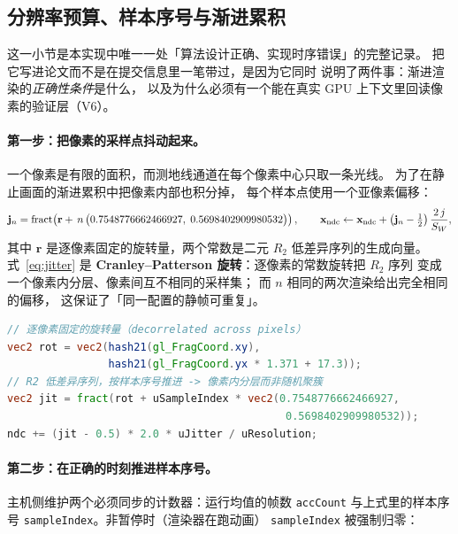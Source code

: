 \subsection{分辨率预算、样本序号与渐进累积}\label{sec:jitter}

这一小节是本实现中唯一一处「算法设计正确、实现时序错误」的完整记录。
把它写进论文而不是在提交信息里一笔带过，是因为它同时
说明了两件事：渐进渲染的\emph{正确性条件}是什么，
以及为什么必须有一个能在真实 GPU 上下文里回读像素的验证层（V6）。

\paragraph{第一步：把像素的采样点抖动起来。}
一个像素是有限的面积，而测地线通道在每个像素中心只取一条光线。
为了在静止画面的渐进累积中把像素内部也积分掉，
每个样本点使用一个亚像素偏移：
\begin{equation}
\mathbf{j}_n=\operatorname{fract}\!\left(\mathbf{r}+\,n\,
\bigl(0.7548776662466927,\;0.5698402909980532\bigr)\right),
\qquad
\mathbf{x}_{\rm ndc}\leftarrow \mathbf{x}_{\rm ndc}
+\left(\mathbf{j}_n-\tfrac12\right)\frac{2\,j}{S_W},
\label{eq:jitter}
\end{equation}
其中 $\mathbf{r}$ 是逐像素固定的旋转量，两个常数是二元
$R_2$ 低差异序列的生成向量。式~\eqref{eq:jitter} 是
\textbf{Cranley--Patterson 旋转}：逐像素的常数旋转把 $R_2$ 序列
变成一个像素内分层、像素间互不相同的采样集；
而 $n$ 相同的两次渲染给出完全相同的偏移，
这保证了「同一配置的静帧可重复」。

\begin{lstlisting}[language=GLSL, caption={抖动相位：逐像素常数旋转 + 样本序号推进（shaders.js 节选）}, label={lst:jitter}]
// 逐像素固定的旋转量（decorrelated across pixels）
vec2 rot = vec2(hash21(gl_FragCoord.xy),
                hash21(gl_FragCoord.yx * 1.371 + 17.3));
// R2 低差异序列，按样本序号推进 -> 像素内分层而非随机聚簇
vec2 jit = fract(rot + uSampleIndex * vec2(0.7548776662466927,
                                            0.5698402909980532));
ndc += (jit - 0.5) * 2.0 * uJitter / uResolution;
\end{lstlisting}

\paragraph{第二步：在正确的时刻推进样本序号。}
主机侧维护两个必须同步的计数器：运行均值的帧数 \texttt{accCount}
与上式里的样本序号 \texttt{sampleIndex}。非暂停时（渲染器在跑动画）
\texttt{sampleIndex} 被强制归零：


